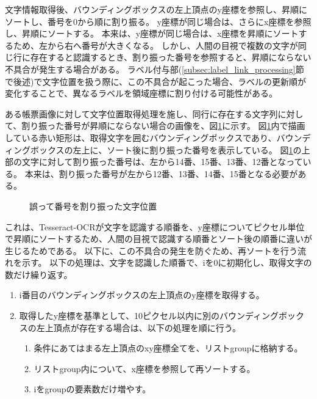文字情報取得後、バウンディングボックスの左上頂点のy座標を参照し、昇順にソートし、番号を0から順に割り振る。
y座標が同じ場合は、さらにx座標を参照し、昇順にソートする。
本来は、y座標が同じ場合は、x座標を昇順にソートするため、左から右へ番号が大きくなる。
しかし、人間の目視で複数の文字が同じ行に存在すると認識するとき、割り振った番号を参照すると、昇順にならない不具合が発生する場合がある。
ラベル付与部(\ref{subsec:label_link_processing}節で後述)で文字位置を扱う際に、この不具合が起こった場合、ラベルの更新順が変化することで、異なるラベルを領域座標に割り付ける可能性がある。

ある帳票画像に対して文字位置取得処理を施し、同行に存在する文字列に対して、割り振った番号が昇順にならない場合の画像を、図\ref{fig:before_sorted_string}に示す。
図\ref{fig:before_sorted_string}内で描画している赤い矩形は、取得文字を囲むバウンディングボックスであり、バウンディングボックスの左上に、ソート後に割り振った番号を表示している。
図\ref{fig:before_sorted_string}の上部の文字に対して割り振った番号は、左から14番、15番、13番、12番となっている。
本来は、割り振った番号が左から12番、13番、14番、15番となる必要がある。

\begin{figure}[t]
    \begin{center}
        \caption{誤って番号を割り振った文字位置}
        \label{fig:before_sorted_string}
    \end{center}
\end{figure}

これは、Tesseract-OCRが文字を認識する順番を、y座標についてピクセル単位で昇順にソートするため、人間の目視で認識する順番とソート後の順番に違いが生じるためである。
以下に、この不具合の発生を防ぐため、再ソートを行う流れを示す。
以下の処理は、文字を認識した順番で、iを0に初期化し、取得文字の数だけ繰り返す。

\begin{enumerate}
    \item i番目のバウンディングボックスの左上頂点のy座標を取得する。
    \item 取得したy座標を基準として、10ピクセル以内に別のバウンディングボックスの左上頂点が存在する場合は、以下の処理を順に行う。
    \begin{enumerate}
        \item 条件にあてはまる左上頂点のxy座標全てを、リストgroupに格納する。
        \item リストgroup内について、x座標を参照して再ソートする。
        \item iをgroupの要素数だけ増やす。
    \end{enumerate}
\end{enumerate}

